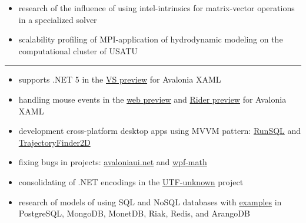 \documentclass[10pt,a4paper,ragged2e,withhyper]{altacv}
\begin{document}
\begin{paracol}{2}
\begin{itemize}
  \item research of the influence of using  intel-intrinsics for matrix-vector
  \newline operations in a specialized solver
  \smallskip

  \item scalability profiling of MPI-application of hydrodynamic modeling
  \newline on the computational cluster of USATU

\end{itemize}

{\color{headingrule}\rule{\linewidth}{1pt}\par}\medskip


\smallskip

\begin{itemize}

  \item supports .NET 5 in the
  \href{https://github.com/AvaloniaUI/AvaloniaVS/pull/181}{VS preview}
  for Avalonia XAML
  \smallskip

  \item handling mouse events in the
  \href{https://github.com/AvaloniaUI/Avalonia/pull/4418}{web preview}
  and \href{https://github.com/ForNeVeR/AvaloniaRider/pull/82}{Rider preview}
  for \newline Avalonia XAML
  \smallskip

  \item development cross-platform desktop apps using MVVM pattern:
  \newline \href{https://github.com/rstm-sf/RunSQL}{RunSQL}
  and \href{https://github.com/rstm-sf/TrajectoryFinder2D}{TrajectoryFinder2D}
  \smallskip

  \item fixing bugs in projects:
  \href{https://github.com/AvaloniaUI/avaloniaui.net/commits?author=rstm-sf}{avaloniaui.net}
  and \href{https://github.com/ForNeVeR/wpf-math/commits?author=rstm-sf}{wpf-math}
  \smallskip

  \item consolidating of .NET encodings in the
  \href{https://github.com/CharsetDetector/UTF-unknown/commits?author=rstm-sf}{UTF-unknown} project
  \smallskip

  \item research of models of using SQL and NoSQL databases with
  \href{https://bitbucket.org/rstm-sf/game_with_db}{examples}
  in PostgreSQL, MongoDB, MonetDB, Riak, Redis, and ArangoDB


\end{itemize}
\end{paracol}
\end{document}
